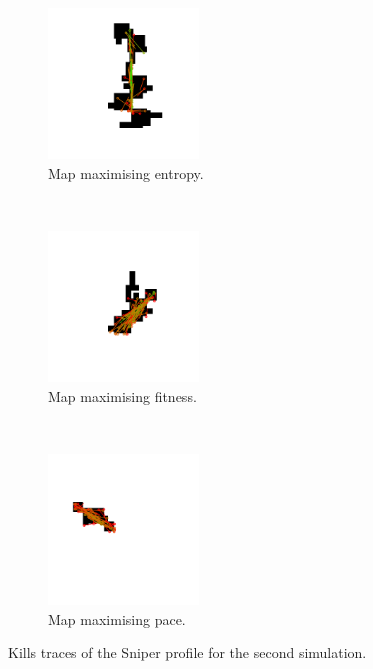 \begin{figure}[H]
    \centering
    \begin{subfigure}[t]{0.3\textwidth}
        \centering
        \includegraphics[height=4.0cm]{Images/images/experiment_two/best_entropy_pop_1/kill_traces_bot_1.png}
        \caption{Map maximising entropy.}
    \end{subfigure}%
    ~ 
    \begin{subfigure}[t]{0.3\textwidth}
        \centering
        \includegraphics[height=4.0cm]{Images/images/experiment_two/best_fitness_pop_1/kill_traces_bot_1.png}
        \caption{Map maximising fitness.}
    \end{subfigure}
    ~ 
    \begin{subfigure}[t]{0.3\textwidth}
        \centering
        \includegraphics[height=4.0cm]{Images/images/experiment_two/best_pace_pop_1/kill_traces_bot_1.png}
        \caption{Map maximising pace.}
    \end{subfigure}
    \caption{Kills traces of the Sniper profile for the second simulation.}
\label{fig:ex_two_end_heatmaps}
\end{figure}

\newpage




